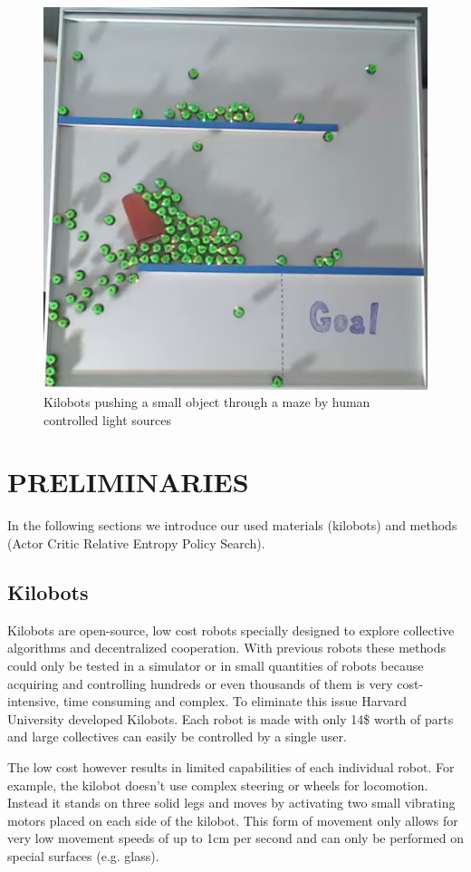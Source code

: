 \documentclass[twoside]{article}
\begin{document}
\begin{figure}[!htb] \centering
\includegraphics[width=0.8\linewidth]{figures/inspiration.png} \caption{Kilobots
pushing a small object through a maze by human controlled light sources}
\end{figure}

\section{PRELIMINARIES} In the following sections we introduce our used
materials (kilobots\cite{kilobot}) and methods (Actor Critic Relative Entropy
Policy Search)\cite{acreps}.

\subsection{Kilobots} Kilobots\cite{kilobot} are open-source, low cost robots
specially designed to explore collective algorithms and decentralized
cooperation. With previous robots these methods could only be tested in a
simulator or in small quantities of robots because acquiring and controlling
hundreds or even thousands of them is very cost-intensive, time consuming and
complex. To eliminate this issue Harvard University developed Kilobots. Each
robot is made with only 14\$ worth of parts and large collectives can easily be
controlled by a single user.

The low cost however results in limited capabilities of each individual robot.
For example, the kilobot doesn't use complex steering or wheels for locomotion.
Instead it stands on three solid legs and moves by activating two small
vibrating motors placed on each side of the kilobot. This form of movement only
allows for very low movement speeds of up to 1cm per second and can only be
performed on special surfaces (e.g. glass).
\end{document}
